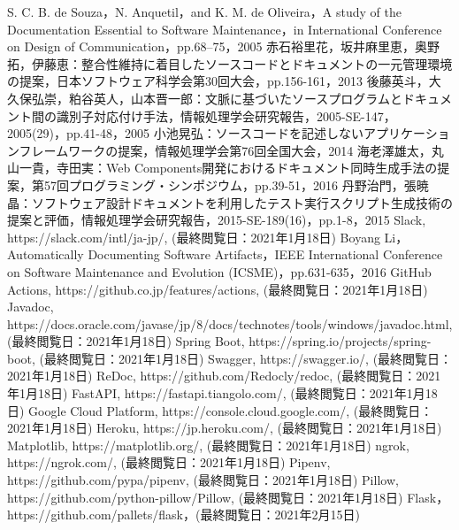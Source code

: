 \begin{thebibliography}{30}
     S. C. B. de Souza，N. Anquetil，and K. M. de Oliveira，A study of the Documentation Essential to Software Maintenance，in International Conference on Design of Communication，pp.68–75，2005
     赤石裕里花，坂井麻里恵，奥野拓，伊藤恵：整合性維持に着目したソースコードとドキュメントの一元管理環境の提案，日本ソフトウェア科学会第30回大会，pp.156-161，2013
     後藤英斗，大久保弘崇，粕谷英人，山本晋一郎：文脈に基づいたソースプログラムとドキュメント間の識別子対応付け手法，情報処理学会研究報告，2005-SE-147，2005(29)，pp.41-48，2005
     小池晃弘：ソースコードを記述しないアプリケーションフレームワークの提案，情報処理学会第76回全国大会，2014
     海老澤雄太，丸山一貴，寺田実：Web Components開発におけるドキュメント同時生成手法の提案，第57回プログラミング・シンポジウム，pp.39-51，2016
     丹野治門，張暁晶：ソフトウェア設計ドキュメントを利用したテスト実行スクリプト生成技術の提案と評価，情報処理学会研究報告，2015-SE-189(16)，pp.1-8，2015
     Slack, https://slack.com/intl/ja-jp/, (最終閲覧日：2021年1月18日)
     Boyang Li，Automatically Documenting Software Artifacts，IEEE International Conference on Software Maintenance and Evolution (ICSME)，pp.631-635，2016
     GitHub Actions, https://github.co.jp/features/actions, (最終閲覧日：2021年1月18日)
     Javadoc, https://docs.oracle.com/javase/jp/8/docs/technotes/tools/windows/javadoc.html, (最終閲覧日：2021年1月18日)
     Spring Boot, https://spring.io/projects/spring-boot, (最終閲覧日：2021年1月18日)
     Swagger, https://swagger.io/, (最終閲覧日：2021年1月18日)
     ReDoc, https://github.com/Redocly/redoc, (最終閲覧日：2021年1月18日)
     FastAPI, https://fastapi.tiangolo.com/, (最終閲覧日：2021年1月18日)
     Google Cloud Platform, https://console.cloud.google.com/, (最終閲覧日：2021年1月18日)
     Heroku, https://jp.heroku.com/, (最終閲覧日：2021年1月18日)
     Matplotlib, https://matplotlib.org/, (最終閲覧日：2021年1月18日)
     ngrok, https://ngrok.com/, (最終閲覧日：2021年1月18日)
     Pipenv, https://github.com/pypa/pipenv, (最終閲覧日：2021年1月18日)
     Pillow, https://github.com/python-pillow/Pillow, (最終閲覧日：2021年1月18日)
     Flask，https://github.com/pallets/flask，(最終閲覧日：2021年2月15日)
\end{thebibliography}